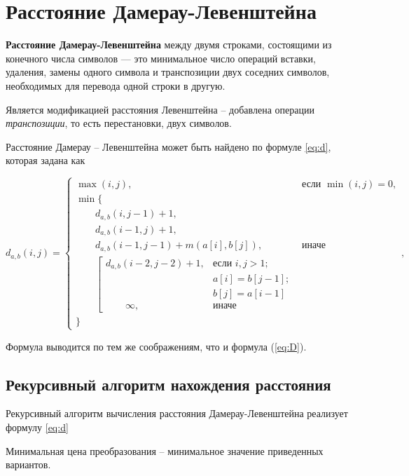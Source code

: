 \section{Расстояние Дамерау-Левенштейна}

\textbf{Расстояние Дамерау-Левенштейна} между двумя строками, состоящими из конечного числа символов — это минимальное число операций вставки, удаления, замены одного символа и транспозиции двух соседних символов, необходимых для перевода одной строки в другую.

Является модификацией расстояния Левенштейна -- добавлена операции \textit{транспозиции}, то есть перестановки, двух символов.

Расстояние Дамерау -- Левенштейна может быть найдено по формуле \ref{eq:d}, которая задана как


\begin{equation}
	\label{eq:d}
	d_{a,b}(i, j) = \begin{cases}
		\max(i, j), &\text{если }\min(i, j) = 0,\\
		\min \lbrace \\
			\qquad d_{a,b}(i, j-1) + 1,\\
			\qquad d_{a,b}(i-1, j) + 1,\\
			\qquad d_{a,b}(i-1, j-1) + m(a[i], b[j]), &\text{иначе}\\
			\qquad \left[ \begin{array}{cc}d_{a,b}(i-2, j-2) + 1, &\text{если }i,j > 1;\\
			\qquad &\text{}a[i] = b[j-1]; \\
			\qquad &\text{}b[j] = a[i-1]\\
			\qquad \infty, & \text{иначе}\end{array}\right.\\
		\rbrace
		\end{cases},
\end{equation}

Формула выводится по тем же соображениям, что и формула (\ref{eq:D}).

\subsection{Рекурсивный алгоритм нахождения расстояния}
Рекурсивный алгоритм вычисления расстояния Дамерау-Левенштейна реализует формулу \ref{eq:d}

Минимальная цена преобразования -- минимальное значение приведенных вариантов.

